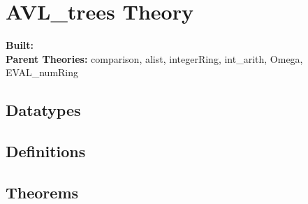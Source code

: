 \documentclass[11pt, twoside]{article}
\begin{document}

\tableofcontents
\cleardoublepage
\HOLpagestyle

\section{AVL_trees Theory}
\begin{flushleft}
\textbf{Built:} \HOLAVLXXtreesDate \\[2pt]
\textbf{Parent Theories:} comparison,
alist,
integerRing,
int_arith,
Omega,
EVAL_numRing
\end{flushleft}

\subsection{Datatypes}

\HOLAVLXXtreesDatatypes

\subsection{Definitions}

\HOLAVLXXtreesDefinitions

\subsection{Theorems}

\HOLAVLXXtreesTheorems
\HOLindex
\end{document}
